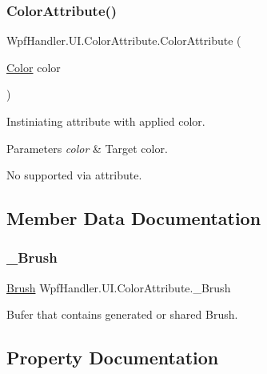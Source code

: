 \subsubsection{\texorpdfstring{Color\+Attribute()}{ColorAttribute()}\hspace{0.1cm}{\footnotesize\ttfamily [4/4]}}
{\footnotesize\ttfamily Wpf\+Handler.\+U\+I.\+Color\+Attribute.\+Color\+Attribute (\begin{DoxyParamCaption}\item[{\mbox{\hyperlink{class_wpf_handler_1_1_u_i_1_1_color_attribute_a6c5c2202427bd48877142ecf85327843}{Color}}}]{color }\end{DoxyParamCaption})}



Instiniating attribute with applied color. 


\begin{DoxyParams}{Parameters}
{\em color} & Target color.\\
\hline
\end{DoxyParams}


No supported via attribute.

\subsection{Member Data Documentation}
\mbox{\label{class_wpf_handler_1_1_u_i_1_1_color_attribute_ae25cb492c8efb5e3ff570452b618ee23}} 
\subsubsection{\texorpdfstring{\+\_\+\+Brush}{\_Brush}}
{\footnotesize\ttfamily \mbox{\hyperlink{class_wpf_handler_1_1_u_i_1_1_color_attribute_afa14c4542d8023b3ddad6aba74993877}{Brush}} Wpf\+Handler.\+U\+I.\+Color\+Attribute.\+\_\+\+Brush\hspace{0.3cm}{\ttfamily [private]}}



Bufer that contains generated or shared Brush. 



\subsection{Property Documentation}
\mbox{\label{class_wpf_handler_1_1_u_i_1_1_color_attribute_afa14c4542d8023b3ddad6aba74993877}} 
